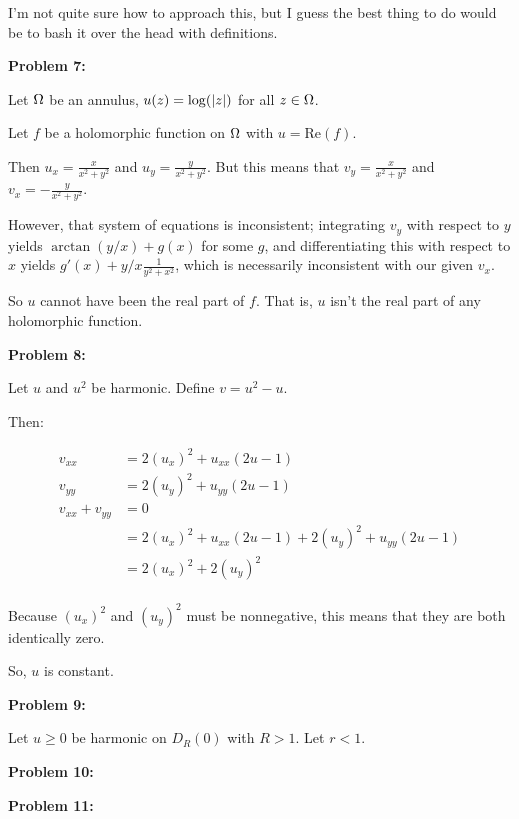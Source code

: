 \documentclass[a4paper,12pt]{article}
\begin{document}
I'm not quite sure how to approach this, but I guess the best thing to do would be to bash it over the head with definitions.

\shunt

{\bf Problem 7:}

Let $\Omega$ be an annulus, $u(z) = \log(\left\lvert z \right\rvert)$ for all $z \in \Omega$.

Let $f$ be a holomorphic function on $\Omega$ with $u = \text{Re}(f)$.

Then $u_x = \frac{x}{x^2+y^2}$ and $u_y = \frac{y}{x^2+y^2}$. But this means that $v_y = \frac{x}{x^2+y^2}$ and $v_x = -\frac{y}{x^2+y^2}$. 

However, that system of equations is inconsistent; integrating $v_y$ with respect to $y$ yields $\arctan(y/x) + g(x)$ for some $g$, and differentiating this with respect to $x$ yields $g'(x) + y/x \frac{1}{y^2+x^2}$, which is necessarily inconsistent with our given $v_x$.

So $u$ cannot have been the real part of $f$. That is, $u$ isn't the real part of any holomorphic function.

\shunt

{\bf Problem 8:}

Let $u$ and $u^2$ be harmonic. Define $v = u^2 - u$.

Then:

\begin{align*}
v_{xx} &= 2(u_x)^2 + u_{xx}(2u-1)\\
v_{yy} &= 2(u_y)^2 + u_{yy}(2u-1)\\
v_{xx} + v_{yy} &=0\\
&= 2(u_x)^2 + u_{xx}(2u-1) + 2(u_y)^2 + u_{yy}(2u-1)\\
&= 2(u_x)^2+ 2(u_y)^2\\
\end{align*}

Because $(u_x)^2$ and $(u_y)^2$ must be nonnegative, this means that they are both identically zero.

So, $u$ is constant.

\shunt

{\bf Problem 9:}

Let $u \geq 0$ be harmonic on $D_R(0)$ with $R > 1$. Let $r <1$.

\shunt

{\bf Problem 10:}

\shunt

{\bf Problem 11:}

\shunt
\end{document}
